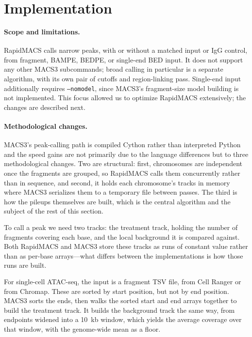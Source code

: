 \documentclass[namedate,webpdf,contemporary,large]{oup-authoring-template}
\begin{document}
\section{Implementation}
\paragraph{Scope and limitations.}
RapidMACS calls narrow peaks, with or without a matched input or IgG control, from fragment, BAMPE, BEDPE, or single-end BED input. It does not support any other MACS3 subcommands; broad calling in particular is a separate algorithm, with its own pair of cutoffs and region-linking pass. Single-end input additionally requires \texttt{--nomodel}, since MACS3's fragment-size model building is not implemented. This focus allowed us to optimize RapidMACS extensively; the changes are described next.

\paragraph{Methodological changes.}
MACS3's peak-calling path is compiled Cython rather than interpreted Python and the speed gains are not primarily due to the language differences but to three methodological changes. Two are structural: first, chromosomes are independent once the fragments are grouped, so RapidMACS calls them concurrently rather than in sequence, and second, it holds each chromosome's tracks in memory where MACS3 serializes them to a temporary file between passes. The third is how the pileups themselves are built, which is the central algorithm and the subject of the rest of this section.

To call a peak we need two tracks: the treatment track, holding the number of fragments covering each base, and the local background it is compared against. Both RapidMACS and MACS3 store these tracks as runs of constant value rather than as per-base arrays---what differs between the implementations is how those runs are built.

For single-cell ATAC-seq, the input is a fragment TSV file, from Cell Ranger or from Chromap. These are sorted by start position, but not by end position. MACS3 sorts the ends, then walks the sorted start and end arrays together to build the treatment track. It builds the background track the same way, from endpoints widened into a 10~kb window, which yields the average coverage over that window, with the genome-wide mean as a floor.
\end{document}
